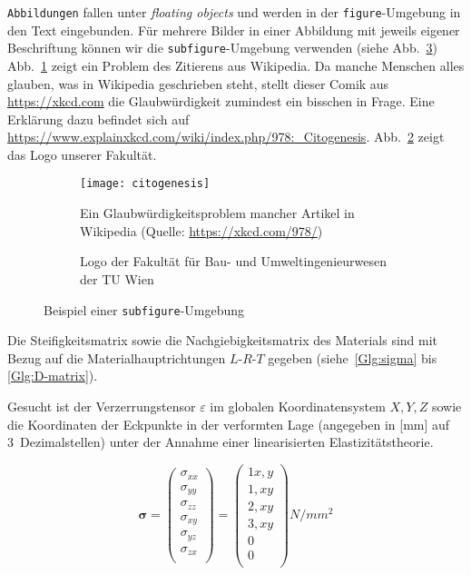 %
\texttt{Abbildungen} fallen unter \emph{floating objects} und werden in der \texttt{figure}-Umgebung in den Text eingebunden.
Für mehrere Bilder in einer Abbildung mit jeweils eigener Beschriftung können wir die \texttt{subfigure}-Umgebung verwenden (siehe Abb.~\ref{fig:bsp-subfigure})
%
Abb.~\ref{fig:xkcd-citogenesis} zeigt ein Problem des Zitierens aus Wikipedia. 
Da manche Menschen alles glauben, was in Wikipedia geschrieben steht, stellt dieser Comik aus \url{https://xkcd.com} die Glaubwürdigkeit zumindest ein bisschen in Frage.
Eine Erklärung dazu befindet sich auf \url{https://www.explainxkcd.com/wiki/index.php/978:_Citogenesis}.
Abb.~\ref{fig:logo-fakultät} zeigt das Logo unserer Fakultät.
%
\begin{figure}[ht]
  \begin{subfigure}[t]{0.50\textwidth}
   \centering
   \texttt{[image: citogenesis]}
   \caption[Zitierproblematik]{Ein Glaubwürdigkeitsproblem mancher Artikel in Wikipedia (Quelle: \url{https://xkcd.com/978/})    \label{fig:xkcd-citogenesis}}
  \end{subfigure}
\hfill
  \begin{subfigure}[t]{0.45\textwidth}
   \centering
   \caption{Logo der Fakultät für Bau- und Umweltingenieurwesen der TU Wien \label{fig:logo-fakultät}}
  \end{subfigure}
\caption{Beispiel einer \texttt{subfigure}-Umgebung \label{fig:bsp-subfigure}}
\end{figure}
%


%
Die Steifigkeitsmatrix sowie die Nachgiebigkeitsmatrix des Materials sind mit Bezug auf die Materialhauptrichtungen $L$-$R$-$T$ gegeben (siehe~\eqref{Glg:sigma} bis \eqref{Glg:D-matrix}).

Gesucht ist der Verzerrungstensor $\varepsilon$ im globalen Koordinatensystem $X,Y,Z$ sowie die Koordinaten der Eckpunkte in der verformten Lage (angegeben in [\si{mm}] auf 3~Dezimalstellen) unter der Annahme einer linearisierten Elastizitätstheorie.

\begin{equation}
\boldsymbol{\sigma}
=
\left(
   \begin{array}{c}
      \sigma_{xx} \\
      \sigma_{yy} \\
      \sigma_{zz} \\
      \sigma_{xy} \\
      \sigma_{yz} \\
      \sigma_{zx} \\
   \end{array}
\right)
=
\left(
   \begin{array}{c}
      1x{,}y \\
      1{,}xy \\
      2{,}xy \\
      3{,}xy \\
      0      \\
      0      \\
   \end{array}
\right)
\si{N/mm^2}
\label{Glg:sigma}
\end{equation}

